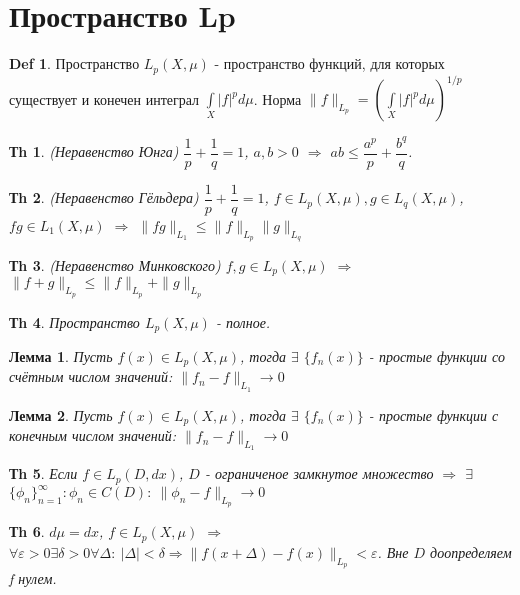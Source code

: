 \documentclass[14pt]{article}
\theoremstyle{plain}
\newtheorem{Thm}{Тh}
\newtheorem{Lem}{Лемма}
\theoremstyle{definition}
\newtheorem{Def}{Def}
\begin{document}
	\section{Пространство Lp}
		\begin{Def}
			Пространство $L_p(X, \mu)$ - пространство функций, для которых существует и конечен интеграл $\int\limits_X |f|^p d\mu$. Норма $\|f\|_{L_p} = \left(\int\limits_X |f|^p d\mu \right)^{1/p}$
		\end{Def}
		\begin{Thm}
			(Неравенство Юнга)\newline
			$\dfrac{1}{p} + \dfrac{1}{q} = 1$, $a, b > 0$ $\Rightarrow$ $ab \leq \dfrac{a^p}{p} + \dfrac{b^q}{q}$. 
		\end{Thm}
		\begin{Thm}
			(Неравенство Гёльдера) \newline
			$\dfrac{1}{p} + \dfrac{1}{q} = 1$, $f\in L_p(X, \mu), g \in L_q(X, \mu)$, $fg \in L_1(X, \mu)$ $\Rightarrow$ $\|fg\|_{L_1} \leq \|f\|_{L_p} \|g\|_{L_q}$
		\end{Thm}
		\begin{Thm}
			(Неравенство Минковского)\newline
			$f, g\in L_p(X, \mu)$ $\Rightarrow$ $\|f+g\|_{L_p} \leq \|f\|_{L_p} + \|g\|_{L_p}$ 
		\end{Thm}
		\begin{Thm}
			Пространство $L_p(X, \mu)$ - полное. 
		\end{Thm}
			\begin{Lem}
			Пусть $f(x) \in L_p(X, \mu)$, тогда $\exists$ $\{f_n(x)\}$ - простые функции со счётным числом значений: $\| f_n - f \|_{L_1} \to 0$
		\end{Lem}
		\begin{Lem}
			Пусть $f(x) \in L_p(X, \mu)$, тогда $\exists$ $\{f_n(x)\}$ - простые функции с конечным числом значений: $\| f_n - f \|_{L_1} \to 0$
		\end{Lem}
		\begin{Thm}
			Если $f \in L_p(D, dx)$, $D$ - ограниченое замкнутое множество $\Rightarrow$ $\exists$ $\{\phi_n\}_{n=1}^{\infty}: \phi_n \in C(D): \ \|\phi_n - f\|_{L_p} \to 0$
		\end{Thm}
		\begin{Thm}
			$d\mu = dx$, $f\in L_p(X, \mu)$ $\Rightarrow$ $\forall \varepsilon > 0 \exists \delta > 0 \forall \Delta: \ |\Delta| < \delta \Rightarrow \|f(x+\Delta) - f(x)\|_{L_p} < \varepsilon$. Вне $D$ доопределяем f нулем. 
		\end{Thm}
\end{document}
